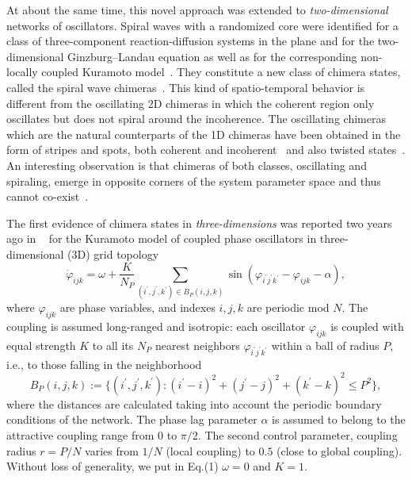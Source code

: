 \documentclass[epjST]{svjour}
\begin{document}
At about the same time,  this novel approach was extended to {\it two-dimensional} networks of oscillators.  Spiral waves with a
randomized core were identified for a class of three-component reaction-diffusion systems in the plane and for the two-dimensional Ginzburg--Landau equation as well as for the corresponding non-locally coupled Kuramoto model~\cite{ks2003,sk2004,kjm2004}.  They constitute a new class of chimera states, called the spiral wave chimeras~\cite{mls2010}.  This kind of spatio-temporal behavior is different from the oscillating 2D chimeras in which the coherent region only oscillates but does not spiral around the incoherence. The oscillating chimeras which are the natural counterparts of the 1D chimeras have been obtained in the form of stripes and spots, both coherent and incoherent~\cite{owyms2012,pa2013} and also twisted states~\cite{xkk2015}.
An interesting observation is that chimeras of both classes, oscillating and spiraling, emerge in opposite corners of the system parameter space and thus cannot co-exist~\cite{owyms2012}.


The first evidence of chimera states in {\it three-dimensions} was reported two years ago in ~\cite{msom2015} for the Kuramoto model of coupled phase oscillators in three-dimensional (3D) grid topology 
\begin{equation}
\dot{\varphi}_{ijk} = \omega+\frac{K}{N_{P}} \sum\limits_{(i^{\prime},j^{\prime},k^{\prime})\in B_{P}(i,j,k) }\sin(\varphi_{i^{\prime}j^{\prime}k^{\prime}} - \varphi_{ijk}- \alpha), 
\end{equation}
where   $\varphi_{ijk}$ are phase variables, and  indexes $i,j,k$ are periodic mod $N$.   The coupling  is  assumed long-ranged and isotropic:  each oscillator $\varphi_{ijk}$ is coupled with equal strength $K$ to all its $N_{P}$ nearest neighbors $\varphi_{i^{\prime}j^{\prime}k^{\prime}}$  within  a ball of radius $P$, i.e., to those falling in the neighborhood 
$$  B_{P}(i,j,k):=\{ (i^{\prime},j^{\prime},k^{\prime}){:} (i^{\prime}-i)^{2}+(j^{\prime}-j)^{2}+(k^{\prime}-k)^{2}\le P^{2}\},$$
where the distances 
are calculated taking into account the periodic boundary conditions of the network.
The phase lag parameter $\alpha$ is assumed to belong to the attractive coupling range from $0$ to $\pi/2$.  
The second control parameter, coupling radius $r=P/N$ varies from $1/N$ (local coupling) to $0.5$ (close to global coupling). Without loss of generality, we put in Eq.(1) $\omega=0$ and $K=1$.
\end{document}
